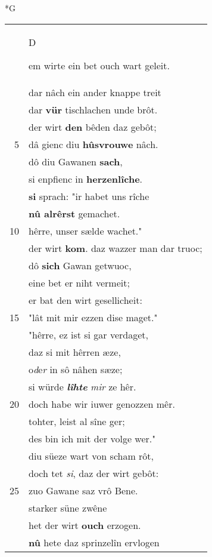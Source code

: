 \documentclass[8pt,a4paper,notitlepage]{article}
\begin{document}
\begin{table}[ht]
\begin{minipage}[t]{0.5\linewidth}
\small
\begin{center}*G
\end{center}
\begin{tabular}{rl}
 & \begin{large}D\end{large}em wirte ein bet ouch wart geleit.\\ 
 & dar nâch ein ander knappe treit\\ 
 & dar \textbf{vür} tischlachen unde brôt.\\ 
 & der wirt \textbf{den} bêden daz gebôt;\\ 
5 & dâ gienc diu \textbf{hûsvrouwe} nâch.\\ 
 & dô diu Gawanen \textbf{sach},\\ 
 & si enpfienc in \textbf{herzenlîche}.\\ 
 & \textbf{si} sprach: "ir habet uns rîche\\ 
 & \textbf{nû alrêrst} gemachet.\\ 
10 & hêrre, unser sælde wachet."\\ 
 & der wirt \textbf{kom}. daz wazzer man dar truoc;\\ 
 & dô \textbf{sich} Gawan getwuoc,\\ 
 & eine bet er niht vermeit;\\ 
 & er bat den wirt gesellicheit:\\ 
15 & "lât mit mir ezzen dise maget."\\ 
 & "hêrre, ez ist si gar verdaget,\\ 
 & daz si mit hêrren æze,\\ 
 & o\textit{d}e\textit{r} in sô nâhen sæze;\\ 
 & si würde \textit{\textbf{lîhte}} \textit{mir} ze hêr.\\ 
20 & doch habe wir iuwer genozzen mêr.\\ 
 & tohter, leist al sîne ger;\\ 
 & des bin ich mit der volge wer."\\ 
 & diu süeze wart von scham rôt,\\ 
 & doch tet \textit{si}, daz der wirt gebôt:\\ 
25 & zuo Gawane saz vrô Bene.\\ 
 & starker süne zwêne\\ 
 & het der wirt \textbf{ouch} erzogen.\\ 
 & \textbf{nû} hete daz sprinzelîn ervlogen\\ 

\end{tabular}
\end{minipage}
\end{table}
\end{document}
